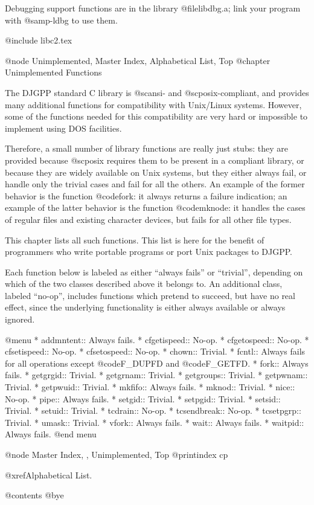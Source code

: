 Debugging support functions are in the library @file{libdbg.a}; link
your program with @samp{-ldbg} to use them.

@include libc2.tex

@node Unimplemented, Master Index, Alphabetical List, Top
@chapter Unimplemented Functions

The DJGPP standard C library is @sc{ansi}- and @sc{posix}-compliant, and
provides many additional functions for compatibility with Unix/Linux
systems.  However, some of the functions needed for this compatibility
are very hard or impossible to implement using DOS facilities.

Therefore, a small number of library functions are really just stubs:
they are provided because @sc{posix} requires them to be present in a
compliant library, or because they are widely available on Unix systems,
but they either always fail, or handle only the trivial cases and fail
for all the others.  An example of the former behavior is the function
@code{fork}: it always returns a failure indication; an example of the
latter behavior is the function @code{mknode}: it handles the cases of
regular files and existing character devices, but fails for all other
file types.

This chapter lists all such functions.  This list is here for the
benefit of programmers who write portable programs or port Unix packages
to DJGPP.

Each function below is labeled as either ``always fails'' or
``trivial'', depending on which of the two classes described above it
belongs to.  An additional class, labeled ``no-op'', includes functions
which pretend to succeed, but have no real effect, since the underlying
functionality is either always available or always ignored.

@menu
* addmntent::                Always fails.
* cfgetispeed::              No-op.
* cfgetospeed::              No-op.
* cfsetispeed::              No-op.
* cfsetospeed::              No-op.
* chown::                    Trivial.
* fcntl::                    Always fails for all operations except
                             @code{F_DUPFD} and @code{F_GETFD}.
* fork::                     Always fails.
* getgrgid::                 Trivial.
* getgrnam::                 Trivial.
* getgroups::                Trivial.
* getpwnam::                 Trivial.
* getpwuid::                 Trivial.
* mkfifo::                   Always fails.
* mknod::                    Trivial.
* nice::                     No-op.
* pipe::                     Always fails.
* setgid::                   Trivial.
* setpgid::                  Trivial.
* setsid::                   Trivial.
* setuid::                   Trivial.
* tcdrain::                  No-op.
* tcsendbreak::              No-op.
* tcsetpgrp::                Trivial.
* umask::                    Trivial.
* vfork::                    Always fails.
* wait::                     Always fails.
* waitpid::                  Always fails.
@end menu

@node Master Index, , Unimplemented, Top
@printindex cp

@xref{Alphabetical List}.

@contents
@bye

